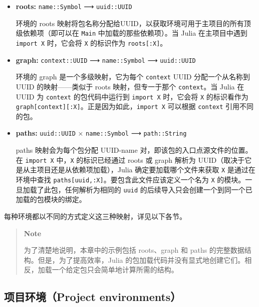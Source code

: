 \begin{itemize}
\item \textbf{roots:} \texttt{name::Symbol} ⟶ \texttt{uuid::UUID}

环境的 roots 映射将包名称分配给UUID，以获取环境可用于主项目的所有顶级依赖项（即可以在 \texttt{Main} 中加载的那些依赖项）。当 Julia 在主项目中遇到 \texttt{import X} 时，它会将 \texttt{X} 的标识作为 \texttt{roots[:X]}。


\item \textbf{graph:} \texttt{context::UUID} ⟶ \texttt{name::Symbol} ⟶ \texttt{uuid::UUID}

环境的 graph 是一个多级映射，它为每个 \texttt{context} UUID 分配一个从名称到 UUID 的映射——类似于 roots 映射，但专一于那个 \texttt{context}。当 Julia 在 UUID 为 \texttt{context} 的包代码中运行到 \texttt{import X} 时，它会将 \texttt{X} 的标识看作为 \texttt{graph[context][:X]}。正是因为如此，\texttt{import X} 可以根据 \texttt{context} 引用不同的包。


\item \textbf{paths:} \texttt{uuid::UUID} × \texttt{name::Symbol} ⟶ \texttt{path::String}

paths 映射会为每个包分配 UUID-name 对，即该包的入口点源文件的位置。在 \texttt{import X} 中，\texttt{X} 的标识已经通过 roots 或 graph 解析为 UUID（取决于它是从主项目还是从依赖项加载），Julia 确定要加载哪个文件来获取 \texttt{X} 是通过在环境中查找 \texttt{paths[uuid,:X]}。要包含此文件应该定义一个名为 \texttt{X} 的模块。一旦加载了此包，任何解析为相同的 \texttt{uuid} 的后续导入只会创建一个到同一个已加载的包模块的绑定。

\end{itemize}


每种环境都以不同的方式定义这三种映射，详见以下各节。



\begin{quote}
\textbf{Note}

为了清楚地说明，本章中的示例包括 roots、graph 和 paths 的完整数据结构。但是，为了提高效率，Julia 的包加载代码并没有显式地创建它们。相反，加载一个给定包只会简单地计算所需的结构。

\end{quote}


\hypertarget{2089876833496138047}{}


\subsection{项目环境（Project environments）}



